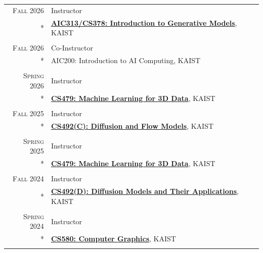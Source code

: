 \documentclass[letterpaper,10pt]{article} %
\begin{document}
\begin{longtable}{r|p{11cm}}

\textsc{Fall 2026} & Instructor\\*
& \href{https://generative-models.kaist.ac.kr/}{\textbf{AIC313/CS378: Introduction to Generative Models}}, KAIST\\
& \\
\textsc{Fall 2026} & Co-Instructor\\*
& AIC200: Introduction to AI Computing, KAIST\\
& \\

\textsc{Spring 2026} & Instructor\\*
& \href{https://3dml.kaist.ac.kr/}{\textbf{CS479: Machine Learning for 3D Data}}, KAIST\\
& \\


\textsc{Fall 2025} & Instructor\\*
& \href{https://diffusion.kaist.ac.kr/}{\textbf{CS492(C): Diffusion and Flow Models}}, KAIST\\
& \\


\textsc{Spring 2025} & Instructor\\*
& \href{https://mhsung.github.io/kaist-cs479-spring-2025/}{\textbf{CS479: Machine Learning for 3D Data}}, KAIST\\
& \\


\textsc{Fall 2024} & Instructor\\*
& \href{https://mhsung.github.io/kaist-cs492d-fall-2024/}{\textbf{CS492(D): Diffusion Models and Their Applications}}, KAIST\\
& \\


\textsc{Spring 2024} & Instructor\\*
& \href{https://mhsung.github.io/kaist-cs580-spring-2024/}{\textbf{CS580: Computer Graphics}}, KAIST\\
& \\



\end{longtable}
\end{document}
